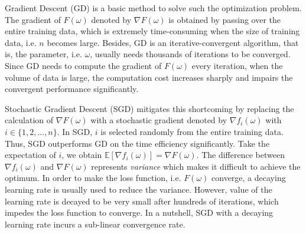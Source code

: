 \documentclass[conference]{IEEEtran}
\begin{document}
Gradient Descent (GD) \citep{Boyd2013Convex} is a basic method to solve such the optimization problem. The gradient of $F(\omega)$ denoted by $\nabla F(\omega)$  is obtained by passing over the entire training data, which is extremely time-consuming when the size of training data, i.e. $n$ becomes large.  Besides, GD is an iterative-convergent algorithm, that is, the parameter, i.e. $\omega$, usually needs thousands of iterations to be converged.   Since GD needs to compute the  gradient of  $F(\omega)$ every iteration, when the volume of data is large, the computation cost increases sharply and impairs the convergent performance significantly. 

Stochastic Gradient Descent (SGD) \citep{Robbins1951A} mitigates this shortcoming by replacing the calculation of $\nabla F(\omega)$ with a stochastic gradient denoted by $\nabla f_i(\omega)$ with $i\in\{1,2, ..., n\}$. In SGD, $i$ is selected randomly  from the entire training data. Thus, SGD outperforms GD on the time efficiency significantly. Take the expectation of $i$, we obtain $\mathbb{E}[\nabla f_i(\omega)] = \nabla F(\omega)$. The difference between $\nabla f_i(\omega)$ and  $\nabla F(\omega)$ represents \emph{variance} which makes it difficult to achieve the optimum.  In order to make the loss function, i.e. $F(\omega)$ converge, a decaying learning rate is usually used to reduce the variance. However, value of the learning rate is decayed to be very small after hundreds of iterations, which impedes the loss function to converge. In a nutshell, SGD with a decaying learning rate incurs a sub-linear convergence rate.

\end{document}
